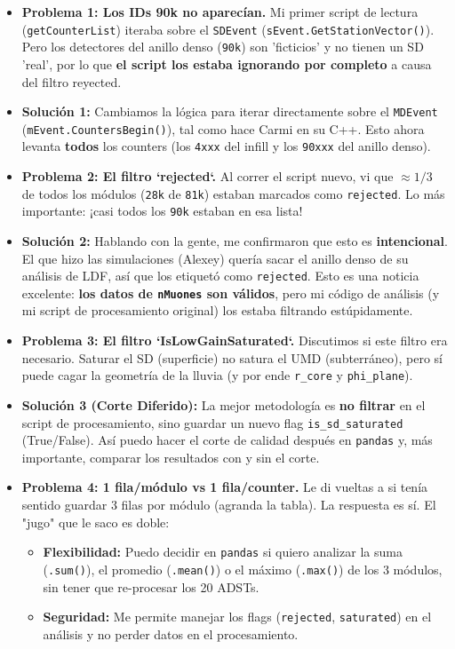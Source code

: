 \begin{itemize}
	\item \textbf{Problema 1: Los IDs 90k no aparecían.} Mi primer script de lectura (\lstinline|getCounterList|) iteraba sobre el \lstinline|SDEvent| (\lstinline|sEvent.GetStationVector()|). Pero los detectores del anillo denso (\lstinline|90k|) son 'ficticios' y no tienen un SD 'real', por lo que \textbf{el script los estaba ignorando por completo} a causa del filtro reyected.
	\item \textbf{Solución 1:} Cambiamos la lógica para iterar directamente sobre el \lstinline|MDEvent| (\lstinline|mEvent.CountersBegin()|), tal como hace Carmi en su C++. Esto ahora levanta \textbf{todos} los counters (los \lstinline|4xxx| del infill y los \lstinline|90xxx| del anillo denso).
	
	\item \textbf{Problema 2: El filtro `rejected`.} Al correr el script nuevo, vi que $\approx 1/3$ de todos los módulos (\lstinline|28k| de \lstinline|81k|) estaban marcados como \lstinline|rejected|. Lo más importante: ¡casi todos los \lstinline|90k| estaban en esa lista!
	\item \textbf{Solución 2:} Hablando con la gente, me confirmaron que esto es \textbf{intencional}. El que hizo las simulaciones (Alexey) quería sacar el anillo denso de su análisis de LDF, así que los etiquetó como \lstinline|rejected|. Esto es una noticia excelente: \textbf{los datos de \lstinline|nMuones| son válidos}, pero mi código de análisis (y mi script de procesamiento original) los estaba filtrando estúpidamente.
	
	\item \textbf{Problema 3: El filtro `IsLowGainSaturated`.} Discutimos si este filtro era necesario. Saturar el SD (superficie) no satura el UMD (subterráneo), pero sí puede cagar la geometría de la lluvia (y por ende \lstinline|r_core| y \lstinline|phi_plane|).
	\item \textbf{Solución 3 (Corte Diferido):} La mejor metodología es \textbf{no filtrar} en el script de procesamiento, sino guardar un nuevo flag \lstinline|is_sd_saturated| (True/False). Así puedo hacer el corte de calidad después en \lstinline|pandas| y, más importante, comparar los resultados con y sin el corte.
	
	\item \textbf{Problema 4: 1 fila/módulo vs 1 fila/counter.} Le di vueltas a si tenía sentido guardar 3 filas por módulo (agranda la tabla). La respuesta es sí. El "jugo" que le saco es doble:
	\begin{itemize}
		\item \textbf{Flexibilidad:} Puedo decidir en \lstinline|pandas| si quiero analizar la suma (\lstinline|.sum()|), el promedio (\lstinline|.mean()|) o el máximo (\lstinline|.max()|) de los 3 módulos, sin tener que re-procesar los 20 ADSTs.
		\item \textbf{Seguridad:} Me permite manejar los flags (\lstinline|rejected|, \lstinline|saturated|) en el análisis y no perder datos en el procesamiento.
	\end{itemize}
\end{itemize}

